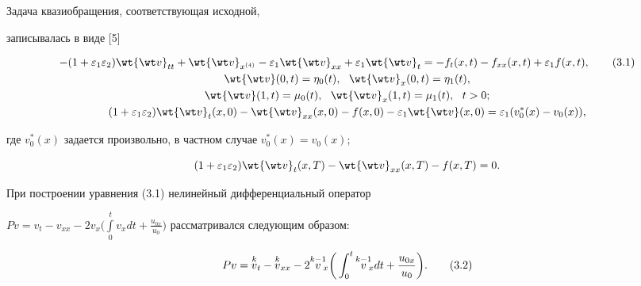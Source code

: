 \begin{pf} 


Задача квазиобращения, соответствующая исходной, 


записывалась в виде [5] 


\begin{gather} 


-(1+\varepsilon_1\varepsilon_2)\wt{\wt v}_{tt} 


+\wt{\wt v}_{x^{(4)}}-\varepsilon_1\wt{\wt v}_{xx} 


+\varepsilon_1\wt{\wt v}_t=-f_t(x,t)-f_{xx}(x,t) 


+\varepsilon_1f(x,t),\tag{3.1} \\ 


% 


\wt{\wt v}(0,t)=\eta_0(t),\ \ \wt{\wt v}_x(0,t)=\eta_1(t),\notag \\ 


% 


\wt{\wt v}(1,t)=\mu_0(t),\ \ \wt{\wt v}_x(1,t)=\mu_1(t), 


\ \ t>0;\notag \\ 


% 


(1+\varepsilon_1\varepsilon_2)\wt{\wt v}_t(x,0)- 


\wt{\wt v}_{xx}(x,0)-f(x,0)- 


\varepsilon_1\wt{\wt v}(x,0)=\varepsilon_1(v^*_0(x)-v_0(x)),\notag 


\end{gather} 


где $v^*_0(x)$ задается произвольно, в частном случае $v^*_0(x)=v_0(x)$; 


$$ 


(1+\varepsilon_1\varepsilon_2)\wt{\wt v}_t(x,T)- 


\wt{\wt v}_{xx}(x,T)-f(x,T)=0. 


$$ 


При построении уравнения (3.1) нелинейный дифференциальный оператор 


$P v=v_t-v_{xx}-2v_x\Big(\int\limits^t_0 v_x dt+ 


\frac{u_{0x}}{u_0}\Big)$ рассматривался следующим образом: 


\begin{equation} 


P v=\up{k}{v}_t-\up{k}{v}_{xx}-2\up{k-1}{v}_{\!\!x} 


\bigg(\int^t_0 \up{k-1}{v}_{\!\!x}dt+\frac{u_{0x}}{u_0}\bigg). 


\tag{3.2} 



\end{equation}
\end{pf}
